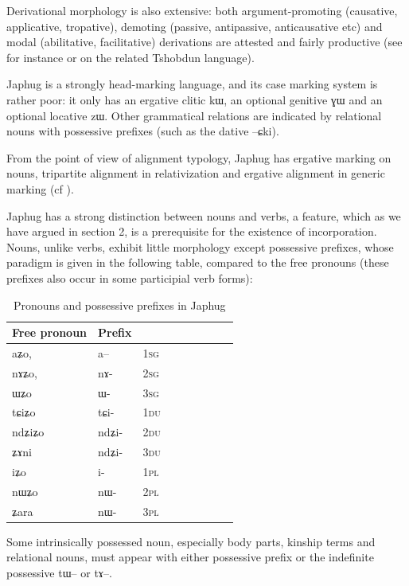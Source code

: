 \documentclass[oldfontcommands,oneside,a4paper,11pt]{article}
\newcommand{\ipa}[1]{{\phon #1}} %
\newcommand{\du}{\textsc{du}}
\newcommand{\pl}{\textsc{pl}}
\newcommand{\sg}{\textsc{sg}}
\begin{document}
 Derivational morphology is also extensive: both argument-promoting (causative, applicative, tropative), demoting (passive, antipassive, anticausative etc) and modal (abilitative, facilitative) derivations are attested and fairly productive (see for instance \citealt{jacques11demotion} or \citet{jackson06paisheng} on the related Tshobdun language).

Japhug is a strongly head-marking language, and its case marking system is rather poor: it only has an ergative clitic \ipa{kɯ}, an optional genitive  \ipa{ɣɯ} and an optional locative \ipa{zɯ}. Other grammatical relations are indicated by relational nouns with possessive prefixes (such as the dative --\ipa{ɕki}).

From the point of view of alignment typology, Japhug has ergative marking on nouns, tripartite alignment in relativization and  ergative alignment in generic marking (cf  \citealt{jacques11demotion}).

Japhug has a strong distinction between nouns and verbs, a feature, which as we have argued in section 2, is a prerequisite for the existence of incorporation. Nouns, unlike verbs, exhibit little morphology except possessive prefixes, whose paradigm is given in the following table, compared to the free pronouns (these prefixes also occur in some participial verb forms):

\begin{table}[H] \centering
\caption{Pronouns and possessive prefixes in Japhug}\label{tab:pronoun}
\begin{tabular}{lllllllll} \toprule
 Free pronoun & Prefix & \\
\midrule
 \ipa{aʑo},     &	\ipa{a--}  &		1\sg{} \\
\ipa{nɤʑo},  &	\ipa{nɤ-}  &			2\sg{} \\
\ipa{ɯʑo}  &	\ipa{ɯ-}  &			3\sg{} \\
\ipa{tɕiʑo}  &	\ipa{tɕi-}  &			1\du{} \\
\ipa{ndʑiʑo}  &	\ipa{ndʑi-}  &		2\du{} \\	
\ipa{ʑɤni}  &	\ipa{ndʑi-}  &		3\du{} \\	
\ipa{iʑo}   &	\ipa{i-}  &			1\pl{} \\
\ipa{nɯʑo}   &	\ipa{nɯ-}  &			2\pl{} \\
\ipa{ʑara}  &	\ipa{nɯ-}  &			3\pl{} \\
\bottomrule
\end{tabular}
\end{table}
 Some intrinsically possessed noun, especially body parts, kinship terms and relational nouns, must appear with either possessive prefix or the indefinite possessive \ipa{tɯ}-- or \ipa{tɤ}--.
\end{document}
